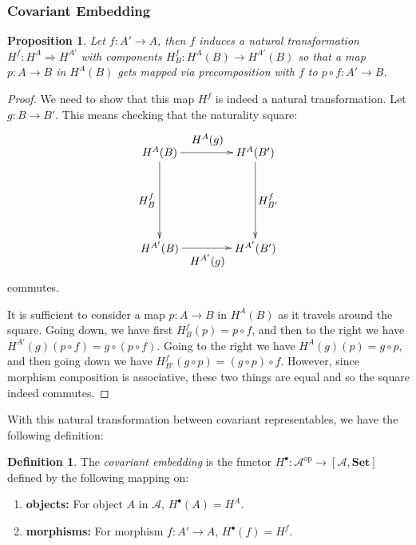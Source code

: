 \documentclass[11pt]{article}
\theoremstyle{definition}
\newtheorem*{defn}{Definition}
\theoremstyle{definition}
\theoremstyle{plain}
\theoremstyle{plain}
\newtheorem{prop}{Proposition}
\theoremstyle{plain}
\begin{document}
\subsubsection*{Covariant Embedding}

\begin{prop}
Let $f:A' \to A$, then $f$ induces a natural transformation $H^{f}: H^{A} \Rightarrow H^{A'}$ with components $H^{f}_{B}:H^{A}(B) \to H^{A'}(B)$ so that a map $p:A \to B$ in $H^{A}(B)$ gets mapped via precomposition with $f$ to $p \circ f: A' \to B$.
\end{prop}

\begin{proof}
We need to show that this map $H^{f}$ is indeed a natural transformation. Let $g:B\to B'$. This means checking that the naturality square:

\begin{equation*}
\begin{xy}
(0,0)*+{H^{A}(B)}="v1";(30,0)*+{H^{A}(B')}="v2";(0,-30)*+{H^{A'}(B)}="v3";(30,-30)*+{H^{A'}(B')}="v4";
{\ar "v1";"v2"}?*!/_4mm/{H^{A}(g)};
{\ar "v1";"v3"}?*!/^4mm/{H^{f}_{B}};
{\ar "v2";"v4"}?*!/_4mm/{H^{f}_{B'}};
{\ar "v3";"v4"}?*!/^4mm/{H^{A'}(g)};
\end{xy}
\end{equation*}

commutes.

It is sufficient to consider a map $p:A \to B$ in $H^{A}(B)$ as it travels around the square. Going down, we have first $H^{f}_{B}(p) = p \circ f$, and then to the right we have $H^{A'}(g)(p \circ f) = g \circ (p \circ f)$. Going to the right we have $H^{A}(g)(p) = g \circ p$, and then going down we have $H^{f}_{B'}(g \circ p) = (g \circ p) \circ f$. However, since morphism composition is associative, these two things are equal and so the square indeed commutes.
\end{proof}

With this natural transformation between covariant representables, we have the following definition:

\begin{defn}
The \emph{covariant embedding} is the functor $H^{\bullet}:\mathscr{A}^{\text{op}} \to [\mathscr{A},\textbf{Set}]$ defined by the following mapping on:
\begin{enumerate}
\item \textbf{objects: } For object $A$ in $\mathscr{A}$, $H^{\bullet}(A) = H^{A}$.
\item \textbf{morphisms: } For morphism $f:A' \to A$, $H^{\bullet}(f) = H^{f}$.
\end{enumerate}
\end{defn}
\end{document}
